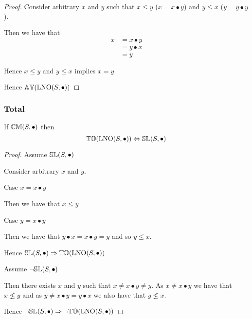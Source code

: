 \documentclass[../Summary.tex]{subfiles}
\begin{document}
\begin{proof}

Consider arbitrary $x$ and $y$ such that $x \leq y$ ($x = x \bullet y$) and $y \leq x$ ($y = y \bullet y$). 

\begin{ind}

Then we have that
\begin{align*}
x 	& = x \bullet y \\
	& = y \bullet x \\
	& = y
\end{align*}

Hence $x \leq y$ and $y \leq x$ implies $x = y$
\end{ind}

Hence ${\mathbb{AY}}(\mathrm{LNO}(S,\bullet))$

\end{proof}



\subsubsection{Total}

\begin{theorem} \label{thm:lno_total}
If ${\mathbb{CM}}(S,\bullet)$ then
\begin{equation*}
{\mathbb{TO}}(\mathrm{LNO}(S,\bullet)) \Leftrightarrow {\mathbb{SL}}(S, \bullet)
\end{equation*}
\end{theorem}


\begin{proof}

\vspace{0.5em}

Assume ${\mathbb{SL}}(S,\bullet)$
\begin{ind}
Consider arbitrary $x$ and $y$.
\begin{ind}
Case $x = x \bullet y$
\begin{ind}
Then we have that $x \leq y$
\end{ind}

Case $y = x \bullet y$
\begin{ind}
Then we have that $y \bullet x = x \bullet y = y$ and so $y \leq x$.
\end{ind}
\end{ind}
\end{ind}
Hence ${\mathbb{SL}}(S,\bullet) \Rightarrow {\mathbb{TO}}(\mathrm{LNO}(S,\bullet))$

\vspace{2em}

Assume $\neg {\mathbb{SL}}(S,\bullet)$
\begin{ind}
Then there exists $x$ and $y$ such that $x \neq x \bullet y \neq y$. As $x \neq x \bullet y$ we have that $x \nleq y$ and as $y \neq x \bullet y = y \bullet x$ we also have that $y \nleq x$.
\end{ind}
Hence $\neg {\mathbb{SL}}(S,\bullet) \Rightarrow \neg {\mathbb{TO}}(\mathrm{LNO}(S,\bullet))$
\end{proof}
\end{document}
